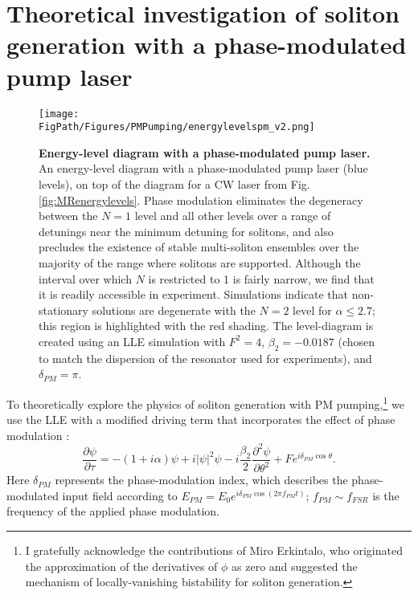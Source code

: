 \section{Theoretical investigation of soliton generation with a phase-modulated pump laser}
\begin{figure}[htpb]
	\begin{center}
		\texttt{[image: \\FigPath/Figures/PMPumping/energylevelspm\_v2.png]}
	\end{center}
	\caption[Energy-level diagram with a phase-modulated pump laser]{\textbf{Energy-level diagram with a phase-modulated pump laser.} An energy-level diagram with a phase-modulated pump laser (blue levels), on top of the diagram for a CW laser from Fig. \ref{fig:MRenergylevels}. Phase modulation eliminates the degeneracy between the $N=1$ level and all other levels over a range of detunings near the minimum detuning for solitons, and also precludes the existence of stable multi-soliton ensembles over the majority of the range where solitons are supported. Although the interval over which $N$ is restricted to 1 is fairly narrow, we find that it is readily accessible in experiment. Simulations indicate that non-stationary solutions are degenerate with the $N=2$ level for $\alpha\leq2.7$; this region is highlighted with the red shading. The level-diagram is created using an LLE simulation with $F^2=4$, $\beta_2=-0.0187$ (chosen to match the dispersion of the resonator used for experiments), and $\delta_{PM}=\pi$.} 
	\label{fig:PMenergylevels}
\end{figure} 

To theoretically explore the physics of soliton generation with PM pumping,\footnote{I gratefully acknowledge the contributions of Miro Erkintalo, who originated the approximation of the derivatives of $\phi$ as zero and suggested the mechanism of locally-vanishing bistability for soliton generation.} we use the LLE with a modified driving term that incorporates the effect of phase modulation \cite{Taheri2015}:
\begin{equation}
\frac{\partial \psi}{\partial \tau}=-(1+i \alpha) \psi + i|\psi|^2 \psi -i \frac{\beta_2}{2} \frac{\partial^2 \psi}{\partial \theta^2} +Fe^{i\delta_{PM}\cos{\theta}}. \label{eq:PMLLE}
\end{equation}
Here $\delta_{PM}$ represents the phase-modulation index, which describes the phase-modulated input field according to $E_{PM}=E_0 e^{i\delta_{PM}\cos(2\pi f_{PM}t)}$; $f_{PM}\sim f_{FSR}$ is the frequency of the applied phase modulation.



